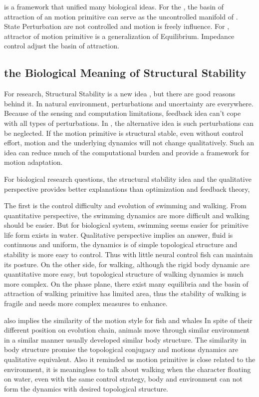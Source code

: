 \moit is a framework that unified many biological ideas.
For the  \umh,  the basin of attraction of an motion primitive can serve as the uncontrolled manifold of \umh.
State Perturbation are not controlled and motion is freely influence.
For \eph, attractor of motion primitive is a generalization of Equilibrium.
Impedance control adjust the basin of attraction.





\subsection{the Biological Meaning of Structural Stability}
For \cms research, Structural Stability is a new idea , but there are good reasons behind it. 
In natural environment, perturbations and uncertainty are everywhere. 
Because of the sensing and computation limitations,  feedback idea  can't cope with all types of perturbations.
In \moit, the alternative idea is such perturbations can be neglected.
If the motion primitive is structural stable, even without control effort, motion and the underlying dynamics will not change qualitatively.
Such an idea can reduce much of the computational burden and provide a framework for motion adaptation.


For biological research questions, the structural stability idea and the qualitative perspective provides better explanations than optimization and feedback theory,

The first is the control difficulty and  evolution of swimming and walking.
From quantitative perspective, the swimming dynamics are more difficult and walking should be easier.
But for biological system, swimming seems easier for primitive life form exists in water.
Qualitative perspective implies an answer, fluid is continuous and uniform, the dynamics is of simple topological structure and stability is more easy to control.
Thus with little neural control fish can maintain its posture. 
On the other side, for walking, although the rigid body dynamic are quantitative more easy, but topological structure of walking dynamics is much more complex. 
On the phase plane, there exist many equilibria and the basin of attraction of walking primitive has limited area,
thus the  stability of walking is fragile and needs more complex measures to enhance.

\moit also implies the similarity of the motion style for fish and whales
In spite of their different position on evolution chain, animals move through similar environment in a similar manner usually developed similar body structure.
The similarity in body structure promise the topological conjugacy and motions dynamics are qualitative equivalent.
Also it reminded us motion primitive is close related to the environment, it is meaningless to talk about walking when the character floating on water, even with the same control strategy, body and environment can not form the dynamics with desired topological structure.



